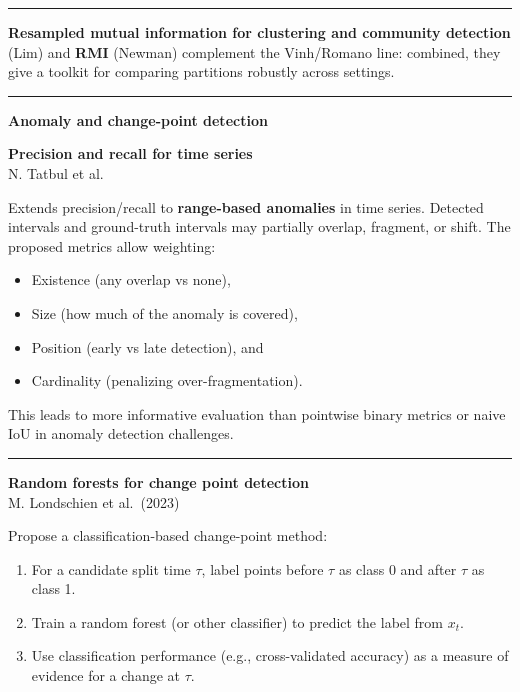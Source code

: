 \documentclass[a5paper]{article}
\providecommand{\tightlist}{%
  \setlength{\itemsep}{0pt}\setlength{\parskip}{0pt}}
\def\subsection#1{{\par\bigskip\goodbreak\large\bfseries #1\par}}
\begin{document}
\begin{center}\rule{0.5\linewidth}{0.5pt}\end{center}

\textbf{Resampled mutual information for clustering and community
detection} (Lim) and \textbf{RMI} (Newman) complement the Vinh/Romano
line: combined, they give a toolkit for comparing partitions robustly
across settings.

\begin{center}\rule{0.5\linewidth}{0.5pt}\end{center}

\subsection{Anomaly and change-point
detection}\label{anomaly-and-change-point-detection}

\textbf{Precision and recall for time series}\\
N. Tatbul et al.

Extends precision/recall to \textbf{range-based anomalies} in time
series. Detected intervals and ground-truth intervals may partially
overlap, fragment, or shift. The proposed metrics allow weighting:

\begin{itemize}
\tightlist
\item
  Existence (any overlap vs none),
\item
  Size (how much of the anomaly is covered),
\item
  Position (early vs late detection), and
\item
  Cardinality (penalizing over-fragmentation).
\end{itemize}

This leads to more informative evaluation than pointwise binary metrics
or naive IoU in anomaly detection challenges.

\begin{center}\rule{0.5\linewidth}{0.5pt}\end{center}

\textbf{Random forests for change point detection}\\
M. Londschien et al.~(2023)

Propose a classification-based change-point method:

\begin{enumerate}
\def\labelenumi{\arabic{enumi}.}
\tightlist
\item
  For a candidate split time $\tau$, label points before $\tau$ as class 0 and
  after $\tau$ as class 1.
\item
  Train a random forest (or other classifier) to predict the label from
  $x_t$.
\item
  Use classification performance (e.g., cross-validated accuracy) as a
  measure of evidence for a change at $\tau$.
\end{enumerate}
\end{document}
